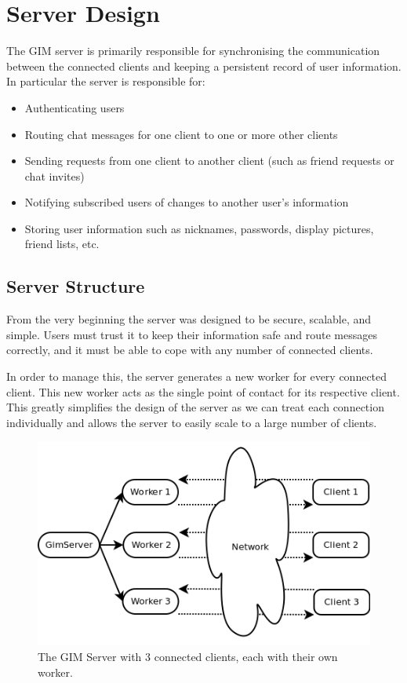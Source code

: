 \section{Server Design}

The GIM server is primarily responsible for synchronising the communication between the connected clients and keeping a persistent record of user information. In particular the server is responsible for:

\begin{itemize}
    \item{Authenticating users}
    \item{Routing chat messages for one client to one or more other clients}
    \item{Sending requests from one client to another client (such as friend requests or chat invites)}
    \item{Notifying subscribed users of changes to another user's information}
    \item{Storing user information such as nicknames, passwords, display pictures, friend lists, etc.}
\end{itemize}

\subsection{Server Structure}

From the very beginning the server was designed to be secure, scalable, and simple. Users must trust it to keep their information safe and route messages correctly, and it must be able to cope with any number of connected clients.

In order to manage this, the server generates a new worker for every connected client. This new worker acts as the single point of contact for its respective client. This greatly simplifies the design of the server as we can treat each connection individually and allows the server to easily scale to a large number of clients.

\begin{figure}[!h]
    \begin{center}
        \includegraphics[scale=0.6]{Design/diagrams/server_workers.png}
        \caption{The GIM Server with 3 connected clients, each with their own worker.}
        \label{WorkersDia}
    \end{center}
\end{figure}


